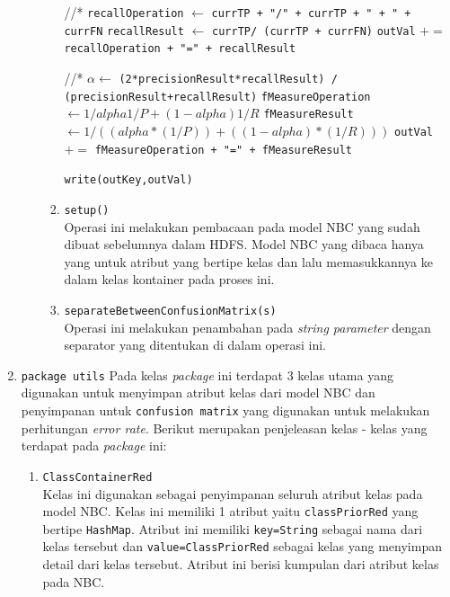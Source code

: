 \begin{enumerate}
\begin{itemize}
\begin{enumerate}
\begin{algorithm}[H]
\begin{algorithmic}[1]
				//*
				\State \texttt{recallOperation} $\gets$ \texttt{currTP + "/" + currTP + " + " + currFN}
				\State \texttt{recallResult} $\gets$ \texttt{currTP/ (currTP + currFN)}
				\State \texttt{outVal} $+=$ \texttt{recallOperation + "=" + recallResult}
				
				//*
				\State $\alpha \gets$ \texttt{(2*precisionResult*recallResult) / (precisionResult+recallResult)}
				\State \texttt{fMeasureOperation} $\gets 1 / {alpha{1 / P}+(1-alpha) 1/R}$
				\State \texttt{fMeasureResult} $\gets 1/((alpha * (1/P)) + ((1 - alpha) * (1/R)))$
				\State \texttt{outVal} $+=$ \texttt{fMeasureOperation + "=" + fMeasureResult}
				
				
			\EndFor
			
			\State \texttt{write(outKey,outVal)}
				
			\EndProcedure
			\end{algorithmic}
			\end{algorithm}
			
			\item{\texttt{setup()}}\\
			Operasi ini melakukan pembacaan pada model NBC yang sudah dibuat sebelumnya dalam HDFS. Model NBC yang dibaca hanya yang untuk atribut yang bertipe kelas dan lalu memasukkannya ke dalam kelas kontainer pada proses ini.
			
			
			\item{\texttt{separateBetweenConfusionMatrix(s)}}\\
			Operasi ini melakukan penambahan pada \textit{string parameter} dengan separator yang ditentukan di dalam operasi ini.
			
		\end{enumerate}
	
		
		
		
	\end{itemize}
	
	\item \texttt{package utils}
	Pada kelas \textit{package} ini	terdapat 3 kelas utama yang digunakan untuk menyimpan atribut kelas dari model NBC dan penyimpanan untuk \texttt{confusion matrix} yang digunakan untuk melakukan perhitungan \textit{error rate}. Berikut merupakan penjeleasan kelas - kelas yang terdapat pada \textit{package} ini:
	\begin{enumerate}
		\item \texttt{ClassContainerRed}\\
		Kelas ini digunakan sebagai penyimpanan seluruh atribut kelas pada model NBC. Kelas ini memiliki 1 atribut yaitu \texttt{classPriorRed} yang bertipe \texttt{HashMap}. Atribut ini memiliki \texttt{key=String} sebagai nama dari kelas tersebut dan \texttt{value=ClassPriorRed} sebagai kelas yang menyimpan detail dari kelas tersebut. Atribut ini berisi kumpulan dari atribut kelas pada NBC.
		

\end{enumerate}
\end{enumerate}
